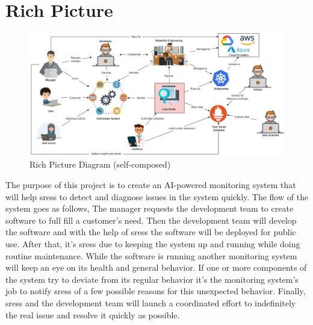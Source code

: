 \section{Rich Picture}

\begin{figure}[H]
    \includegraphics[width=16cm]{assets/requirement-specification/rich-picture.png}
    \caption{Rich Picture Diagram (self-composed)}
    \label{fig:rich-picture}
\end{figure}

The purpose of this project is to create an AI-powered monitoring system that will help \acp{sres} to detect and diagnose issues in the system quickly. The flow of the system goes as follows, The manager requests the development team to create software to full fill a customer's need. Then the development team will develop the software and with the help of \acp{sres} the software will be deployed for public use. After that, it's \acp{sres} due to keeping the system up and running while doing routine maintenance. While the software is running another monitoring system will keep an eye on its health and general behavior. If one or more components of the system try to deviate from its regular behavior it's the monitoring system's job to notify \acp{sres} of a few possible reasons for this unexpected behavior. Finally, \acp{sres} and the development team will launch a coordinated effort to indefinitely the real issue and resolve it quickly as possible. 